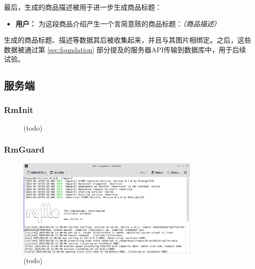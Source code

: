 最后，生成的商品描述被用于进一步生成商品标题：

\begin{itemize}
    \item[] \textbf{用户：} 为这段商品介绍产生一个言简意赅的商品标题：\textit{（商品描述）}
\end{itemize}

生成的商品标题、描述等数据其后被收集起来，并且与其图片相绑定。之后，这些数据被通过第 \ref{sec:foundation} 部分提及的服务器API传输到数据库中，用于后续试验。

\subsection{服务端}

\subsubsection{RmInit}


\begin{figure}[htbp]
    \hfill
	\caption{(todo)}
	\label{fig:rminit}
\end{figure}

\subsubsection{RmGuard}

\begin{figure}[htbp]
	\centering
	\includegraphics[width=0.8\textwidth]{./exp/rmg-core.png}
	\caption{(todo)}
	\label{fig:rmg-core}
\end{figure}

